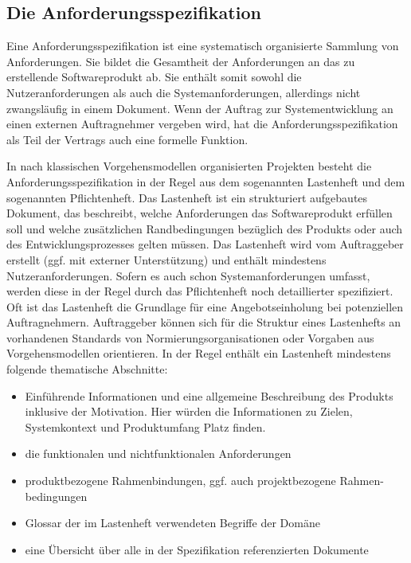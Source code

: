 \subsection{Die Anforderungsspezifikation}
\label{sec:Kap-6.2.4}

Eine Anforderungsspezifikation ist eine systematisch organisierte Sammlung von Anforderungen. Sie bildet die Gesamtheit der Anforderungen an das zu erstellende Softwareprodukt ab. Sie enthält somit sowohl die Nutzeranforderungen als auch die Systemanforderungen, allerdings nicht zwangsläufig in einem Dokument. Wenn der Auftrag zur Systementwicklung an einen externen Auftragnehmer vergeben wird, hat die Anforderungsspezifikation als Teil der Vertrags auch eine formelle Funktion. 

In nach klassischen Vorgehensmodellen organisierten Projekten besteht die Anforderungsspezifikation in der Regel aus dem sogenannten Lastenheft und dem sogenannten Pflichtenheft.  Das Lastenheft ist ein strukturiert aufgebautes Dokument, das beschreibt, welche Anforderungen das Softwareprodukt erfüllen soll und welche zusätzlichen Randbedingungen bezüglich des Produkts oder auch des Entwicklungsprozesses gelten müssen. Das Lastenheft wird vom Auftraggeber erstellt (ggf. mit externer Unterstützung) und enthält mindestens Nutzeranforderungen. Sofern es auch schon Systemanforderungen umfasst, werden diese in der Regel durch das Pflichtenheft noch detaillierter spezifiziert. Oft ist das Lastenheft die Grundlage für eine Angebotseinholung bei potenziellen Auftragnehmern. Auftraggeber können sich für die Struktur eines Lastenhefts an vorhandenen Standards von Normierungs\-organisationen oder Vorgaben aus Vorgehensmodellen orientieren. In der Regel enthält ein Lastenheft mindestens folgende thematische Abschnitte:

\begin{itemize}
	\item Einführende Informationen und eine allgemeine Beschreibung des Produkts inklusive der Motivation. Hier würden die Informationen zu Zielen, Systemkontext und Produktumfang Platz finden.
	\item die funktionalen und nichtfunktionalen Anforderungen
	\item produktbezogene Rahmenbindungen, ggf. auch projektbezogene Rahmen-
	\linebreak %
	bedingungen
	\item Glossar der im Lastenheft verwendeten Begriffe der Domäne
	\item eine Übersicht über alle in der Spezifikation referenzierten Dokumente
\end{itemize}

